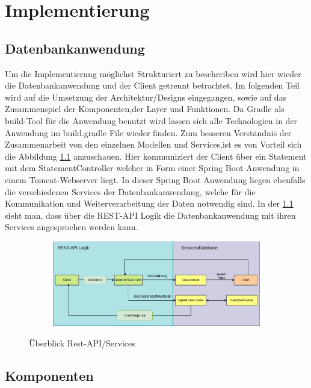 \chapter{Implementierung}
\label{Implementierung}

\section{Datenbankanwendung}

Um die Implementierung möglichst Strukturiert zu beschreiben wird hier wieder die Datenbankanwendung und der Client getrennt betrachtet.
Im folgenden Teil wird auf die Umsetzung der Architektur/Designs eingegangen, sowie auf das Zusammenspiel der Komponenten,der Layer und Funktionen.
Da Gradle als build-Tool für die Anwendung benutzt wird lassen sich alle Technologien in der Anwendung im build.gradle File wieder finden. 
Zum besseren Verständnis der Zusammenarbeit von den einzelnen Modellen und Services,ist es von Vorteil sich die Abbildung \ref{graf_3} anzuschauen.
Hier kommuniziert der Client über ein Statement mit dem StatementController welcher in Form einer Spring Boot Anwendung in einem Tomcat-Webserver liegt.
In dieser Spring Boot Anwendung liegen ebenfalls die verschiedenen Services der Datenbankanwendung, welche für die Kommunikation und Weiterverarbeitung der Daten notwendig sind. In der \ref{graf_3} sieht man, dass über die REST-API Logik die Datenbankanwendung mit ihren Services angesprochen werden kann.

\begin{figure}[h]
  \centering
  \begin{subfigure}[b]{1.0\textwidth}
    \includegraphics[width=1.0\linewidth]{img/logic}
  \end{subfigure}
  \caption{Überblick Rest-API/Services}
  \label{graf_3}
\end{figure}

\section{Komponenten}

